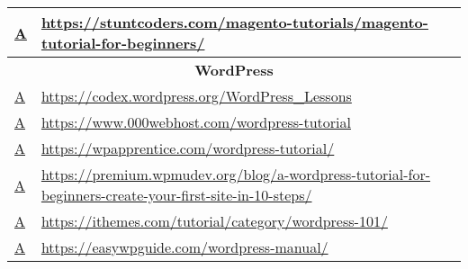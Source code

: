 \begin{table}[ht!]
{\begin{tabular}{|l|p{20cm}|}
  \href{https://web.archive.org/web/20181113030453/https://stuntcoders.com/magento-tutorials/magento-tutorial-for-beginners/}{A}                                    & \href{https://stuntcoders.com/magento-tutorials/magento-tutorial-for-beginners/}{https://stuntcoders.com/magento-tutorials/magento-tutorial-for-beginners/} \\ \hline
\multicolumn{2}{|c|}{\textbf{WordPress}}  \\ \hline
  \href{https://web.archive.org/web/20190213173303/https://codex.wordpress.org/WordPress_Lessons}{A}                                                           & \href{https://codex.wordpress.org/WordPress_Lessons}{https://codex.wordpress.org/WordPress\_Lessons}                                                   \\ \hline
  \href{https://web.archive.org/web/20190213173339/https://www.000webhost.com/wordpress-tutorial}{A}                                                           & \href{https://www.000webhost.com/wordpress-tutorial}{https://www.000webhost.com/wordpress-tutorial}                                                   \\ \hline
  \href{https://web.archive.org/web/20190213173500/https://wpapprentice.com/wordpress-tutorial/}{A}                                                            & \href{https://wpapprentice.com/wordpress-tutorial/}{https://wpapprentice.com/wordpress-tutorial/}                                                   \\ \hline
  \href{https://web.archive.org/web/20190213173528/https://premium.wpmudev.org/blog/a-wordpress-tutorial-for-beginners-create-your-first-site-in-10-steps/}{A} & \href{https://premium.wpmudev.org/blog/a-wordpress-tutorial-for-beginners-create-your-first-site-in-10-steps/}{https://premium.wpmudev.org/blog/a-wordpress-tutorial-for-beginners-create-your-first-site-in-10-steps/}                                                   \\ \hline
  \href{https://web.archive.org/web/20190213173600/https://ithemes.com/tutorial/category/wordpress-101/}{A}                                                    & \href{https://ithemes.com/tutorial/category/wordpress-101/}{https://ithemes.com/tutorial/category/wordpress-101/}                                                   \\ \hline
  \href{https://web.archive.org/web/20190213173628/https://easywpguide.com/wordpress-manual/}{A}                                                               & \href{https://easywpguide.com/wordpress-manual/}{https://easywpguide.com/wordpress-manual/}                                                   \\ \hline

\end{tabular}}
\end{table}
